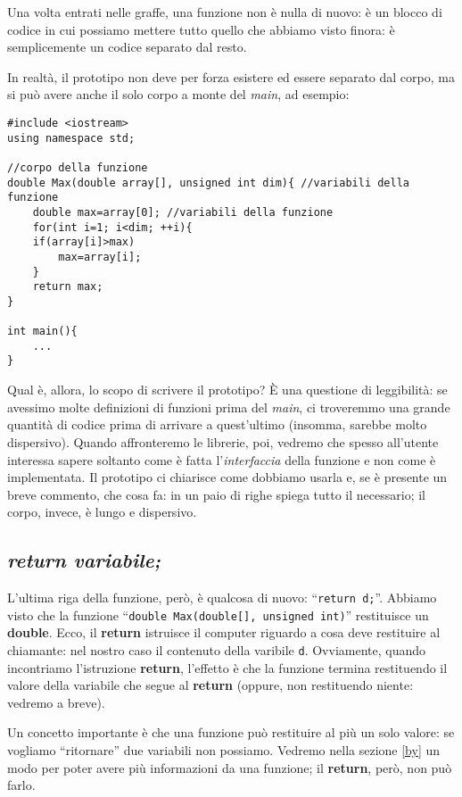 Una volta entrati nelle graffe, una funzione non è nulla di nuovo: è un blocco di codice in cui possiamo mettere tutto quello che abbiamo visto finora: è semplicemente un codice separato dal resto.\

In realtà, il prototipo non deve per forza esistere ed essere separato dal corpo, ma si può  avere anche il solo corpo a monte del \emph{main}, ad esempio:

\begin{lstlisting}
#include <iostream>
using namespace std;

//corpo della funzione
double Max(double array[], unsigned int dim){ //variabili della funzione
	double max=array[0]; //variabili della funzione
	for(int i=1; i<dim; ++i){
	if(array[i]>max)
		max=array[i];	
	}
	return max;
}

int main(){
	...
}
\end{lstlisting}

Qual è, allora, lo scopo di scrivere il prototipo? È una questione di leggibilità: se avessimo molte definizioni di funzioni prima del \emph{main}, ci troveremmo una grande quantità di codice prima di arrivare a quest'ultimo (insomma, sarebbe molto dispersivo). Quando affronteremo le librerie, poi, vedremo che spesso all'utente interessa sapere soltanto come è fatta l'\emph{interfaccia} della funzione e non come è implementata. Il prototipo ci chiarisce come dobbiamo usarla e, se è presente un breve commento, che cosa fa: in un paio di righe spiega tutto il necessario; il corpo, invece, è lungo e dispersivo.
\subsection{\emph{return variabile;}}
L'ultima riga della funzione, però, è qualcosa di nuovo:  ``\lstinline|return d;|''. Abbiamo visto che la funzione ``\lstinline|double Max(double[], unsigned int)|'' restituisce un \textbf{double}. Ecco, il \textbf{return} istruisce il computer riguardo a cosa deve restituire al chiamante: nel nostro caso il contenuto della varibile \verb|d|. Ovviamente, quando incontriamo l'istruzione \textbf{return}, l'effetto è che la funzione termina restituendo il valore della variabile che segue al \textbf{return} (oppure, non restituendo niente: vedremo a breve).

Un concetto importante è che una funzione può restituire al più un solo valore: se vogliamo ``ritornare'' due variabili non possiamo. Vedremo nella sezione \ref{by} un modo per poter avere più informazioni da una funzione; il \textbf{return}, però, non può farlo.

